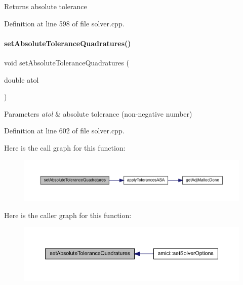 \begin{DoxyReturn}{Returns}
absolute tolerance 
\end{DoxyReturn}


Definition at line 598 of file solver.\+cpp.

\mbox{\label{classamici_1_1_solver_af425163c5d98c472d17e080da4ee3b78}} 
\paragraph{\texorpdfstring{set\+Absolute\+Tolerance\+Quadratures()}{setAbsoluteToleranceQuadratures()}}
{\footnotesize\ttfamily void set\+Absolute\+Tolerance\+Quadratures (\begin{DoxyParamCaption}\item[{double}]{atol }\end{DoxyParamCaption})}


\begin{DoxyParams}{Parameters}
{\em atol} & absolute tolerance (non-\/negative number) \\
\hline
\end{DoxyParams}


Definition at line 602 of file solver.\+cpp.

Here is the call graph for this function\+:
\nopagebreak
\begin{figure}[H]
\begin{center}
\leavevmode
\includegraphics[width=350pt]{classamici_1_1_solver_af425163c5d98c472d17e080da4ee3b78_cgraph}
\end{center}
\end{figure}
Here is the caller graph for this function\+:
\nopagebreak
\begin{figure}[H]
\begin{center}
\leavevmode
\includegraphics[width=350pt]{classamici_1_1_solver_af425163c5d98c472d17e080da4ee3b78_icgraph}
\end{center}
\end{figure}
\mbox{\label{classamici_1_1_solver_ae598de1a48d3c4af1d08b8436d481e11}} 
